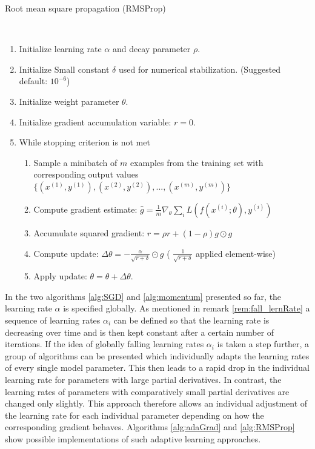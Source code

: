 \begin{algorithm}
	\caption{Root mean square propagation (RMSProp)  \cite{goodfellow2016deep}}\label{alg:RMSProp}
	\begin{algorithmic}
		\\
		\begin{enumerate}
			\item Initialize learning rate $\alpha$ and decay parameter $\rho$.		
			\item Initialize Small constant $\delta$ used for numerical stabilization. (Suggested default: $10^{-6}$)
			\item Initialize weight parameter $\theta$.
			\item Initialize gradient accumulation variable: $r = 0$.
			\item While stopping criterion is not met
			\begin{enumerate}[label=\emph{\alph*})]
				\item Sample a minibatch of $m$ examples from the training set with corresponding output values
				$\{(x^{(1)}, y^{(1)}), (x^{(2)}, y^{(2)}), ..., (x^{(m)}, y^{(m)})\}$
				\item Compute gradient estimate: $\hat{g} = \frac{1}{m} \nabla_\theta \sum_i L(f(x^{(i)};\theta), y^{(i)})$
				\item Accumulate squared gradient: $r = \rho r + (1 - \rho)g \odot g$
				\item Compute update: $\Delta \theta = - \frac{\alpha}{\sqrt{r + \delta}} \odot g$ ( $\frac{1}{\sqrt{r + \delta}}$ applied element-wise)
				\item Apply update: $\theta = \theta + \Delta \theta$.
			\end{enumerate}
		\end{enumerate}
	\end{algorithmic}
\end{algorithm}

In the two algorithms \ref{alg:SGD} and \ref{alg:momentum} presented so far, the learning rate $\alpha$ is specified globally. As mentioned in remark \ref{rem:fall_lernRate} a sequence of learning rates $\alpha_i$ can be defined so that the learning rate is decreasing over time and is then kept constant after a certain number of iterations. If the idea of globally falling learning rates $\alpha_i$ is taken a step further, a group of algorithms can be presented which individually adapts the learning rates of every single model parameter. This then leads to a rapid drop in the individual learning rate for parameters with large partial derivatives. In contrast, the learning rates of parameters with comparatively small partial derivatives are changed only slightly. This approach therefore allows an individual adjustment of the learning rate for each individual parameter depending on how the corresponding gradient behaves. Algorithms \ref{alg:adaGrad} and \ref{alg:RMSProp} show possible implementations of such adaptive learning approaches.

